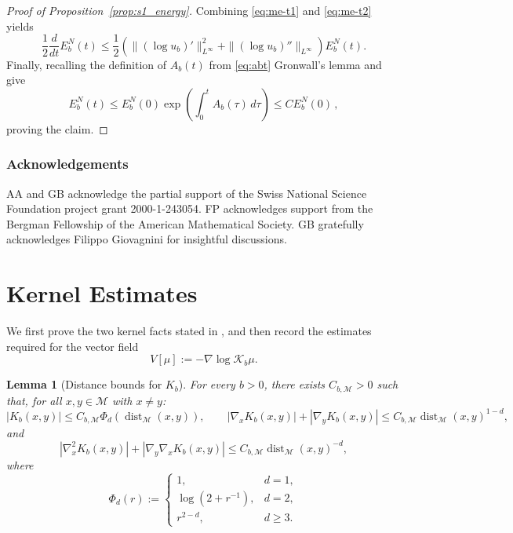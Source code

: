 \documentclass[11pt]{article}
\newtheorem{lemma}[theorem]{Lemma}
\theoremstyle{definition}
\def\K{\mathcal K}
\def\M{\mathcal M}
\begin{document}
\begin{proof}[Proof of Proposition~\ref{prop:s1_energy}]
Combining \eqref{eq:me-t1} and \eqref{eq:me-t2} yields
\[
\frac12\frac{d}{dt}E^N_b(t)
\le
\frac12
\left(
\|(\log u_b)'\|_{L^\infty}^2
+
\|(\log u_b)''\|_{L^\infty}
\right)E^N_b(t).
\]
Finally, recalling the definition of $A_b(t)$ from \eqref{eq:abt} Gronwall's lemma and  give
\[
E^N_b(t)
\le
E^N_b(0)\exp\!\left(\int_0^tA_b(\tau)\,d\tau\right)
\le
C E^N_b(0)\,,
\]
proving the claim.
\end{proof}

\subsubsection*{Acknowledgements}  AA and GB acknowledge the partial support of the Swiss National Science Foundation project grant 2000-1-243054. FP acknowledges support from the Bergman Fellowship of the American Mathematical Society.
GB gratefully acknowledges Filippo Giovagnini for insightful discussions.




\appendix
\section{Kernel Estimates}\label{app:kernel_facts}

We first prove the two kernel facts stated in , and then
record the estimates required for the vector field
\begin{equation}
\label{eq:def_V}
V[\mu]:=-\nabla\log \K_b\mu .
\end{equation}

\begin{lemma}[Distance bounds for \(K_b\)]\label{lem:wellposed_kernel_distance_bounds} For every $b>0$, there exists $C_{b,\M}>0$ such that, for all $x,y\in \M$ with $x\neq y$:
\begin{equation}\label{eq:wellposed_kernel_distance_zero_first}
|K_b(x,y)|\le C_{b,\M}\Phi_d(\operatorname{dist}_{\M}(x,y)),
\qquad
|\nabla_xK_b(x,y)|+|\nabla_yK_b(x,y)|
\le C_{b,\M}\operatorname{dist}_{\M}(x,y)^{1-d},
\end{equation}
and
\begin{equation}\label{eq:wellposed_kernel_distance_second}
|\nabla_x^2K_b(x,y)|+|\nabla_y\nabla_xK_b(x,y)|
\le C_{b,\M}\operatorname{dist}_{\M}(x,y)^{-d},
\end{equation}
where
\[
\Phi_d(r):=
\begin{cases}
1, & d=1,\\
\log(2+r^{-1}), & d=2,\\
r^{2-d}, & d\ge3.
\end{cases}
\]
\end{lemma}
\end{document}
